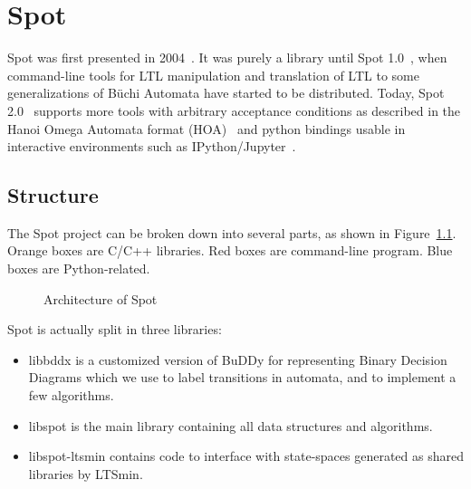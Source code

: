 \chapter{Spot}
Spot was first presented in 2004~\cite{2}. It was purely a library until Spot 1.0~\cite{1}, when
command-line tools for LTL manipulation and translation of LTL to some generalizations of Büchi Automata
have started to be distributed. Today, Spot 2.0~\cite{25} supports more tools with arbitrary acceptance
conditions as described in the Hanoi Omega Automata format (HOA)~\cite{3} and python bindings usable in
interactive environments such as IPython/Jupyter~\cite{4}.

\section{Structure}
The Spot project can be broken down into several parts, as shown in Figure~\ref{fig:arch}. Orange boxes
are C/C++ libraries. Red boxes are command-line program. Blue boxes are Python-related.
\begin{figure}[H]
 \centering
 
 \caption{Architecture of Spot}
 \label{fig:arch}
\end{figure}
Spot is actually split in three libraries:
\begin{itemize}
 \item libbddx is a customized version of BuDDy for representing Binary Decision Diagrams which we use to
label transitions in automata, and to implement a few algorithms.
 \item libspot is the main library containing all data structures and algorithms.
 \item libspot-ltsmin contains code to interface with state-spaces generated as shared libraries by LTSmin.
\end{itemize}


